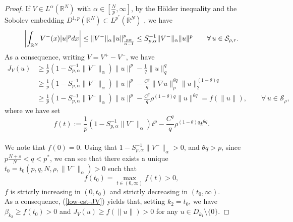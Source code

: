 \documentclass[11pt,reqno]{amsart}
\theoremstyle{definition}
\numberwithin{equation}{section}
\numberwithin{theorem}{section}
\numberwithin{equation}{section}
\numberwithin{theorem}{section}
\newcommand{\rn}{\mathbb{R}^N}
\newcommand{\R}{\mathbb{R}}
\newcommand{\raj}[1]{{\textcolor{magenta}{#1}}} %
\begin{document}
\begin{proof}
If $V\in L^\alpha(\R^N)$ with $\alpha\in[\frac{N}{p},\infty]$, by the H\"{o}lder inequality and the Sobolev embedding $D^{1,p}(\rn)\subset L^{p^*}(\rn)$%
, we have
\begin{equation}\notag
\left|\int_{\rn}V^-(x)|u|^pdx\right|\le\|V^-\|_{\alpha}\|u\|^p_{\frac{p\alpha}{\alpha-1}}\le S_{p,\alpha}^{-1}\|V^-\|_{\alpha}\|u\|^p\qquad\forall\,u\in \mathcal{S}_{\rho,r}.
\end{equation}
As a consequence, writing $V=V^+-V^-$, we have %
\begin{equation}\label{low-est-JV}
\begin{aligned}
J_V(u)&\ge \frac{1}{p}(1-S_{p,\alpha}^{-1}\|V^-\|_{\alpha})\|u\|^p%
- \frac{1}{q}\|u\|_q^q\\
    &%
    \ge\frac{1}{p}(1-S_{p,\alpha}^{-1}\|V^-\|_{\alpha})\|u\|^p
    - \frac{C^q}{q}\|\nabla u\|_p^{\theta q}\|u\|_2^{(1-\theta)q}\\
    &\ge \frac{1}{p}(1-S_{p,\alpha}^{-1}\|V^-\|_{\alpha})\|u\|^p-\frac{C^q}{q}\rho^{(1-\theta)q}\|u\|^{\theta q}=f(\|u\|),\qquad \forall\, u\in \mathcal{S}_{\rho},
\end{aligned}
\end{equation}
where we have set $$f(t):=\frac{1}{p}(1-S_{p,\alpha}^{-1}\|V^-\|_{\alpha})t^p-\frac{C^q}{q}\rho^{(1-\theta)q}t^{\theta q}.$$\\

We note that $f(0)=0$. Using that $1-S_{p,\alpha}^{-1}\|V^-\|_{\alpha}>0$, and $\theta q>p$, since $p\frac{N+s}{N}<q<p^*$, we can see that there exists a unique $t_0=t_0(p,q,N,\rho,\|V^-\|_{\alpha})>0$ such that $$f(t_0)=\max_{t\in(0,\infty)}f(t)>0,$$ 
$f$ is strictly increasing in $(0,t_0)$ and strictly decreasing in $(t_0,\infty)$.\\

As a consequence, (\ref{low-est-JV}) yields that, setting $k_2=t_0$, we have $\beta_{k_2}\ge f(t_0)>0$ and $J_V(u)\ge f(\|u\|)>0$ for any $u\in D_{k_1}\setminus\{0\}$.



\end{proof}
\end{document}
